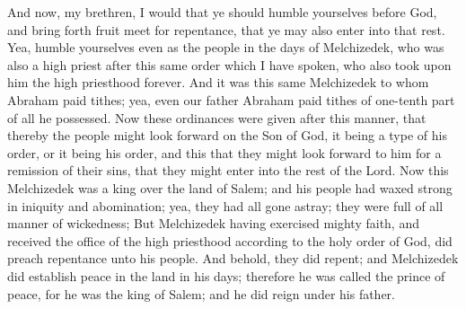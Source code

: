And now, my brethren, I would that ye should humble yourselves before God, and bring forth fruit meet for repentance, that ye may also enter into that rest.
\bverse \iffalse Yea, humble yourselves even as the people in the days of Melchizedek, who was also a high priest after this same order which I have spoken, who also took upon him the high priesthood forever. \fi
Yea, humble yourselves even as the people in the days of Melchizedek, who was also a high priest after this same order which I have spoken, who also took upon him the high priesthood forever.
\bverse \iffalse And it was this same Melchizedek to whom Abraham paid tithes; yea, even our father Abraham paid tithes of one-tenth part of all he possessed. \fi
And it was this same Melchizedek to whom Abraham paid tithes; yea, even our father Abraham paid tithes of one-tenth part of all he possessed.
\bverse \iffalse Now these ordinances were given after this manner, that thereby the people might look forward on the Son of God, it being a type of his order, or it being his order, and this that they might look forward to him for a remission of their sins, that they might enter into the rest of the Lord. \fi
Now these ordinances were given after this manner, that thereby the people might look forward on the Son of God, it being a type of his order, or it being his order, and this that they might look forward to him for a remission of their sins, that they might enter into the rest of the Lord.
\bverse \iffalse Now this Melchizedek was a king over the land of Salem; and his people had waxed strong in iniquity and abomination; yea, they had all gone astray; they were full of all manner of wickedness; \fi
Now this Melchizedek was a king over the land of Salem; and his people had waxed strong in iniquity and abomination; yea, they had all gone astray; they were full of all manner of wickedness;
\bverse \iffalse But Melchizedek having exercised mighty faith, and received the office of the high priesthood according to the holy order of God, did preach repentance unto his people. And behold, they did repent; and Melchizedek did establish peace in the land in his days; therefore he was called the prince of peace, for he was the king of Salem; and he did reign under his father. \fi
But Melchizedek having exercised mighty faith, and received the office of the high priesthood according to the holy order of God, did preach repentance unto his people. And behold, they did repent; and Melchizedek did establish peace in the land in his days; therefore he was called the prince of peace, for he was the king of Salem; and he did reign under his father.
